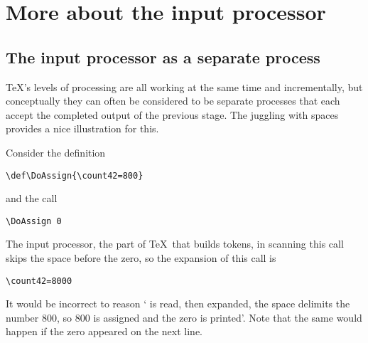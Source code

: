 \documentclass{book}
\begin{document}
\section{More about the input processor}

\subsection{The input processor as a separate process}

\TeX's levels of processing are all working at the
same time and incrementally, but conceptually they can often be
considered to be separate processes that each accept the
completed output of the previous stage. The juggling with
spaces provides a nice illustration for this.

Consider the definition
\begin{verbatim}
\def\DoAssign{\count42=800}
\end{verbatim}
and the call
\begin{verbatim}
\DoAssign 0
\end{verbatim}
The input processor, the part
of \TeX\ that builds tokens, in scanning this call
skips the space before the zero, so the expansion of this
call is
\begin{verbatim}
\count42=8000
\end{verbatim}
It would be incorrect to reason
` is read, then expanded, the space delimits the
number 800, so 800 is assigned and the zero is printed'.
Note that the same would happen if the zero appeared on the next line.
\end{document}
